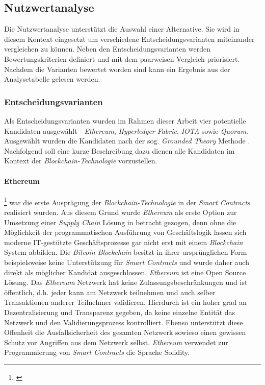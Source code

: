 \subsection{Nutzwertanalyse}
Die Nutzwertanalyse unterstützt die Auswahl einer Alternative. Sie wird in diesem Kontext eingesetzt um verschiedene Entscheidungsvarianten miteinander vergleichen zu können. Neben den Entscheidungsvarianten werden Bewertungskriterien definiert und mit dem paarweisen Vergleich priorisiert. Nachdem die Varianten bewertet worden sind kann ein Ergebnis aus der Analysetabelle gelesen werden.

\subsubsection{Entscheidungsvarianten}
Als Entscheidungsvarianten wurden im Rahmen dieser Arbeit vier potentielle Kandidaten ausgewählt - \textit{Ethereum}, \textit{Hyperledger Fabric}, \textit{IOTA} sowie \textit{Quorum}. Ausgewählt wurden die Kandidaten nach der sog. \textit{Grounded Theory} Methode \citep{Strbing2002}. Nachfolgend soll eine kurze Beschreibung dazu dienen alle Kandidaten im Kontext der \textit{Blockchain-Technologie} vorzustellen.

\paragraph{Ethereum}\footnote{\citet{Buterin2013}}
war die erste Ausprägung der \textit{Blockchain-Technologie} in der \textit{Smart Contracts} realisiert wurden. Aus diesem Grund wurde \textit{Ethereum} als erste Option zur Umsetzung einer \textit{Supply Chain} Lösung in betracht gezogen, denn ohne die Möglichkeit der programmatischen Ausführung von Geschäftslogik lassen sich moderne IT-gestützte Geschäftsprozesse gar nicht erst mit einem \textit{Blockchain} System abbilden. Die \textit{Bitcoin Blockchain} besitzt in ihrer ursprünglichen Form beispielsweise keine Unterstützung für \textit{Smart Contracts} und wurde daher auch direkt als möglicher Kandidat ausgeschlossen. \textit{Ethereum} ist eine Open Source Lösung. Das \textit{Ethereum} Netzwerk hat keine Zulassungsbeschränkungen und ist öffentlich, d.h. jeder kann am Netzwerk teilnehmen und auch selber Transaktionen anderer Teilnehmer validieren. Hierdurch ist ein hoher grad an Dezentralisierung und Transparenz gegeben, da keine einzelne Entität das Netzwerk und den Validierungsprozess kontrolliert. Ebenso unterstützt diese Offenheit die Ausfallsicherheit des gesamten Netzwerk sowieso einen gewissen Schutz vor Angriffen aus dem Netzwerk selbst. \textit{Ethereum} verwendet zur Programmierung von \textit{Smart Contracts} die Sprache Solidity.

